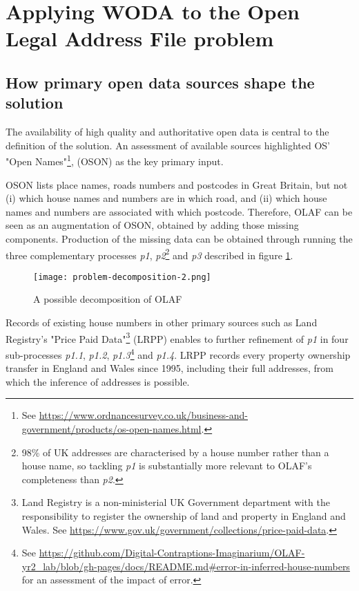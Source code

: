 \section{Applying WODA to the Open Legal Address File problem}
\label{crowdsourcing-olaf}

\subsection{How primary open data sources shape the solution}

The availability of high quality and authoritative open data is central to the definition of the solution. An assessment of available sources highlighted OS' "Open Names"\footnote{See \url{https://www.ordnancesurvey.co.uk/business-and-government/products/os-open-names.html}.}, (OSON) as the key primary input. 

OSON lists place names, roads numbers and postcodes in Great Britain, but not (i) which house names and numbers are in which road, and (ii) which house names and numbers are associated with which postcode. Therefore, OLAF can be seen as an augmentation of OSON, obtained by adding those missing components. Production of the missing data can be obtained through running the three complementary processes {\it p1}, {\it p2}\footnote{98\% of UK addresses are characterised by a house number rather than a house name, so tackling {\it p1} is substantially more relevant to OLAF's completeness than {\it p2}.} and {\it p3} described in figure \ref{fig:problem_decomposition_2}. 

\begin{figure}
	\texttt{[image: problem-decomposition-2.png]}
	\caption{A possible decomposition of OLAF}
	\label{fig:problem_decomposition_2}
\end{figure}

Records of existing house numbers in other primary sources such as Land Registry's "Price Paid Data"\footnote{Land Registry is a non-ministerial UK Government department with the responsibility to register the ownership of land and property in England and Wales. See \url{https://www.gov.uk/government/collections/price-paid-data}.} (LRPP) enables to further refinement of {\it p1} in four sub-processes {\it p1.1}, {\it p1.2}, {\it p1.3}\footnote{See \url{https://github.com/Digital-Contraptions-Imaginarium/OLAF-yr2_lab/blob/gh-pages/docs/README.md#error-in-inferred-house-numbers} for an assessment of the impact of error.} and {\it p1.4}. LRPP records every property ownership transfer in England and Wales since 1995, including their full addresses, from which the inference of addresses is possible.

